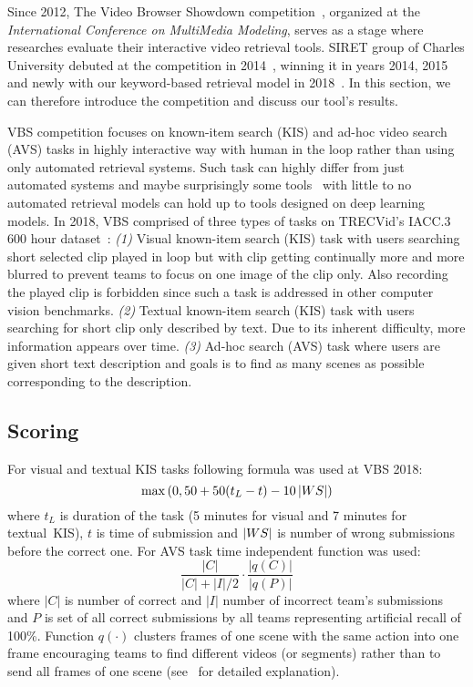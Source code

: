 Since 2012, The Video Browser Showdown competition~\cite{cobarzan2017interactive,Lokoc-influential-trends}, organized at the \textit{International Conference on MultiMedia Modeling}, serves as a stage where researches evaluate their interactive video retrieval tools. SIRET group of Charles University debuted at the competition in 2014~\cite{Lokoc-VBS2014}, winning it in years 2014, 2015 and newly with our keyword-based retrieval model in 2018~\cite{lokovc2018revisiting}. In this section, we can therefore introduce the competition and discuss our tool's results.

VBS competition focuses on known-item search (KIS) and ad-hoc video search (AVS) tasks in highly interactive
way with human in the loop rather than using only automated retrieval systems. Such task can highly differ from just automated systems and maybe surprisingly some tools~\cite{Storyboard-Based_Interface,duane2018virtual} with little to no automated retrieval models can hold up to tools designed on deep learning models. In 2018, VBS comprised of three types of tasks on TRECVid's IACC.3 600 hour dataset~\cite{awad2016trecvid}: \textit{(1)} Visual known-item search (KIS) task with users searching short selected clip played in loop but with clip getting continually more and more blurred to prevent teams to focus on one image of the clip only. Also recording the played clip is forbidden since such a task is addressed in other computer vision benchmarks. \textit{(2)} Textual known-item search (KIS) task with users searching for short clip only described by text. Due to its inherent difficulty, more information appears over time. \textit{(3)} Ad-hoc search (AVS) task where users are given short text description and goals is to find as many scenes as possible corresponding to the description.

\subsection{Scoring}
For visual and textual KIS tasks following formula was used at VBS 2018:
\begin{equation}
\max\left(0, 50 + 50 (t_L-t) - 10\left|{WS}\right|\right)
\end{equation}
where $t_L$ is duration of the task (5 minutes for visual and 7 minutes for textual~KIS), $t$ is time of submission and $\left|{WS}\right|$ is number of wrong submissions before the correct one. For AVS task time independent function was used:
\begin{equation}
\frac{|C|}{|C|+|I|/2}\cdot\frac{|q(C)|}{|q(P)|}
\end{equation}
where $|C|$ is number of correct and $|I|$ number of incorrect team's submissions and $P$ is set of all correct submissions by all teams representing artificial recall of 100\%. Function $q(\cdot)$ clusters frames of one scene with the same action into one frame encouraging teams to find different videos (or segments) rather than to send all frames of one scene (see~\cite{Lokoc-influential-trends} for detailed explanation).

